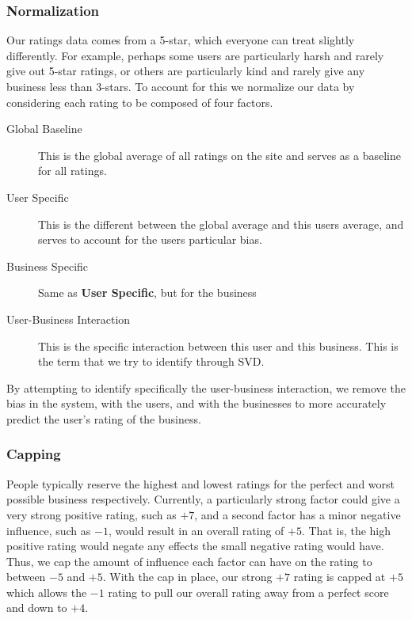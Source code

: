 \subsubsection{Normalization}

Our ratings data comes from a 5-star, which everyone can treat slightly
differently.  For example, perhaps some users are particularly harsh and rarely
give out 5-star ratings, or others are particularly kind and rarely give any
business less than 3-stars. To account for this we normalize our data by
considering each rating to be composed of four factors.

\begin{description}

  \item[Global Baseline] This is the global average of all ratings on the site
and serves as a baseline for all ratings.

  \item[User Specific] This is the different between the global average and
this users average, and serves to account for the users particular bias.

  \item[Business Specific] Same as \textbf{User Specific}, but for the business

  \item[User-Business Interaction] This is the specific interaction between this
user and this business. This is the term that we try to identify through SVD. 

\end{description}

By attempting to identify specifically the user-business interaction, we remove
the bias in the system, with the users, and with the businesses to more
accurately predict the user's rating of the business. 

\subsubsection{Capping}

People typically reserve the highest and lowest ratings for the perfect and
worst possible business respectively. Currently, a particularly strong factor
could give a very strong positive rating, such as $+7$, and a second factor has
a minor negative influence, such as $-1$, would result in an overall rating of
$+5$. That is, the high positive rating would negate any effects the small
negative rating would have. Thus, we cap the amount of influence each factor
can have on the rating to between $-5$ and $+5$. With the cap in place, our
strong $+7$ rating is capped at $+5$ which allows the $-1$ rating to pull our
overall rating away from a perfect score and down to $+4$. \cite{black website}

